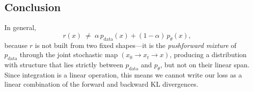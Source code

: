\documentclass{article}
\begin{document}
\subsection*{Conclusion}
In general,
\[
r(x) \;\neq\; \alpha\,p_{\text{data}}(x) + (1-\alpha)\,p_\theta(x),
\]
because $r$ is not built from two fixed shapes—it is the \emph{pushforward mixture} of $p_{\text{data}}$
through the joint stochastic map $(x_0 \!\to\! x_t \!\to\! x)$,
producing a distribution with structure that lies strictly between $p_{\text{data}}$ and $p_\theta$,
but not on their linear span. Since integration is a linear operation, this means we cannot write our loss as a linear combination of the forward and backward KL divergences.
\end{document}
